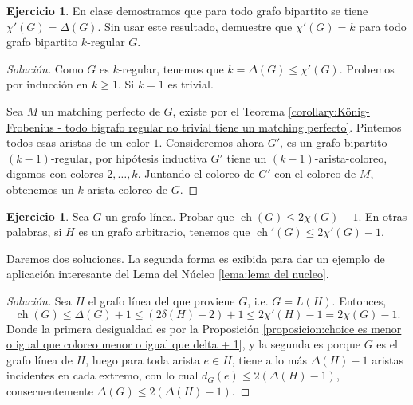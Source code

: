 \documentclass[12pt]{report}
\theoremstyle{plain}
\theoremstyle{definition}
\newtheorem{exercise}[theorem]{Ejercicio}
\newenvironment{solution}{\begin{proof}[Solución]}{\end{proof}}
\newcommand{\ch}[1]{\operatorname{ch} (#1)}
\begin{document}
\begin{exercise}
En clase demostramos que para todo grafo bipartito se tiene $\chi' (G) = \Delta (G)$. Sin usar este resultado, demuestre que $\chi' (G) = k$ para todo grafo bipartito $k$-regular $G$.
\end{exercise}

\begin{solution}
Como $G$ es $k$-regular, tenemos que $k = \Delta (G) \leq \chi ' (G)$. Probemos por inducción en $k\geq 1$. Si $k = 1$ es trivial.

Sea $M$ un matching perfecto de $G$, existe por el Teorema \ref{corollary:König-Frobenius - todo bigrafo regular no trivial tiene un matching perfecto}. Pintemos todos esas aristas de un color $1$. Consideremos ahora $G'$, es un grafo bipartito $(k-1)$-regular, por hipótesis inductiva $G'$ tiene un $(k-1)$-arista-coloreo, digamos con colores $2, \ldots, k$. Juntando el coloreo de $G'$ con el coloreo de $M$, obtenemos un $k$-arista-coloreo de $G$.
\end{solution}

\begin{exercise}
Sea $G$ un grafo línea. Probar que $\ch G \leq 2 \chi (G) - 1$. En otras palabras, si $H$ es un grafo arbitrario, tenemos que $\operatorname{ch}' (G) \leq 2 \chi ' (G) - 1$.
\end{exercise}

Daremos dos soluciones. La segunda forma es exibida para dar un ejemplo de aplicación interesante del Lema del Núcleo \ref{lema:lema del nucleo}.

\begin{solution}
Sea $H$ el grafo línea del que proviene $G$, i.e. $G = L(H)$. Entonces,
\[
    \ch G \leq \Delta (G) + 1 \leq (2 \delta (H) - 2) + 1 \leq 2 \chi ' (H) - 1 = 2 \chi (G) - 1.
\]
Donde la primera desigualdad es por la Proposición \ref{proposicion:choice es menor o igual que coloreo menor o igual que delta + 1}, y la segunda es porque $G$ es el grafo línea de $H$, luego para toda arista $e \in H$, tiene a lo más $\Delta (H) - 1$ aristas incidentes en cada extremo, con lo cual $d_G (e) \leq 2 (\Delta (H) - 1)$, consecuentemente $\Delta (G) \leq 2 (\Delta (H)- 1)$.
\end{solution}
\end{document}
